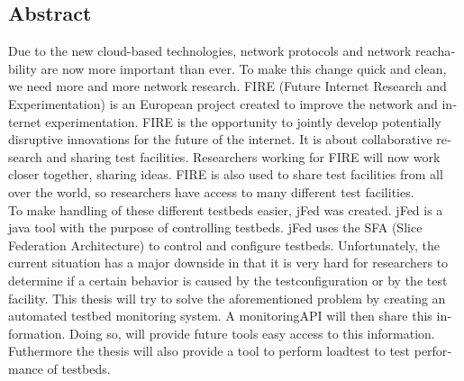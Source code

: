 \newpage
\begin{otherlanguage}{english}
\chapter*{Abstract}
\npar
Due to the new cloud-based technologies, network protocols and network reachability are now more important than ever. To make this change quick and clean, we need more and more network research. FIRE (Future Internet Research and Experimentation) is an European project created to improve the network and internet experimentation. FIRE is the opportunity to jointly develop potentially disruptive innovations for the future of the internet. It is about collaborative research and sharing test facilities. Researchers working for FIRE will now work closer together, sharing ideas. FIRE is also used to share test facilities from all over the world, so researchers have access to many different test facilities.\\

To make handling of these different testbeds easier, jFed was created. jFed is a java tool with the purpose of controlling testbeds. jFed uses the SFA (Slice Federation Architecture) to control and configure testbeds. Unfortunately, the current situation has a major downside in that it is very hard for researchers to determine if a certain behavior is caused by the testconfiguration or by the test facility. 
\npar
This thesis will try to solve the aforementioned problem by creating an automated testbed monitoring system. A monitoringAPI will then share this information. Doing so, will provide future tools easy access to this information. Futhermore the thesis will also provide a tool to perform loadtest to test performance of testbeds.
\end{otherlanguage}